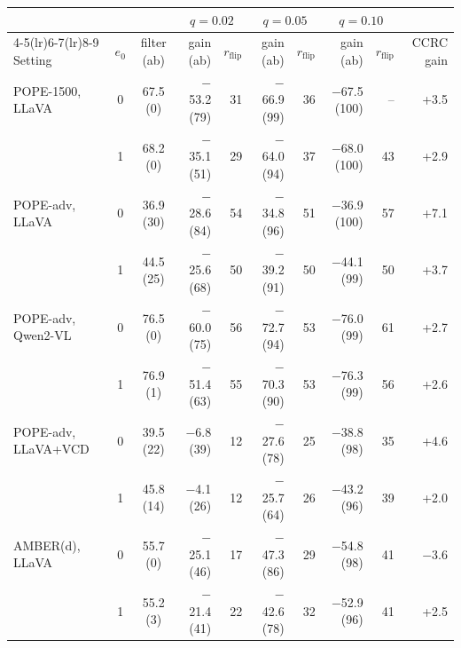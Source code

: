 \begin{tabular}{lccrrrrrrr}
\toprule
 & & & \multicolumn{2}{c}{$q{=}0.02$} & \multicolumn{2}{c}{$q{=}0.05$} & \multicolumn{2}{c}{$q{=}0.10$} & \\
\cmidrule(lr){4-5}\cmidrule(lr){6-7}\cmidrule(lr){8-9}
Setting & $e_0$ & filter (ab) & gain (ab) & $r_{\text{flip}}$ & gain (ab) & $r_{\text{flip}}$ & gain (ab) & $r_{\text{flip}}$ & CCRC gain\\
\midrule
POPE-1500, LLaVA & 0 & 67.5 (0) & $-$53.2 (79) & 31 & $-$66.9 (99) & 36 & $-$67.5 (100) & -- & +3.5\\
 & 1 & 68.2 (0) & $-$35.1 (51) & 29 & $-$64.0 (94) & 37 & $-$68.0 (100) & 43 & +2.9\\
\addlinespace
POPE-adv, LLaVA & 0 & 36.9 (30) & $-$28.6 (84) & 54 & $-$34.8 (96) & 51 & $-$36.9 (100) & 57 & +7.1\\
 & 1 & 44.5 (25) & $-$25.6 (68) & 50 & $-$39.2 (91) & 50 & $-$44.1 (99) & 50 & +3.7\\
\addlinespace
POPE-adv, Qwen2-VL & 0 & 76.5 (0) & $-$60.0 (75) & 56 & $-$72.7 (94) & 53 & $-$76.0 (99) & 61 & +2.7\\
 & 1 & 76.9 (1) & $-$51.4 (63) & 55 & $-$70.3 (90) & 53 & $-$76.3 (99) & 56 & +2.6\\
\addlinespace
POPE-adv, LLaVA+VCD & 0 & 39.5 (22) & $-$6.8 (39) & 12 & $-$27.6 (78) & 25 & $-$38.8 (98) & 35 & +4.6\\
 & 1 & 45.8 (14) & $-$4.1 (26) & 12 & $-$25.7 (64) & 26 & $-$43.2 (96) & 39 & +2.0\\
\addlinespace
AMBER(d), LLaVA & 0 & 55.7 (0) & $-$25.1 (46) & 17 & $-$47.3 (86) & 29 & $-$54.8 (98) & 41 & $-$3.6\\
 & 1 & 55.2 (3) & $-$21.4 (41) & 22 & $-$42.6 (78) & 32 & $-$52.9 (96) & 41 & +2.5\\
\bottomrule
\end{tabular}
